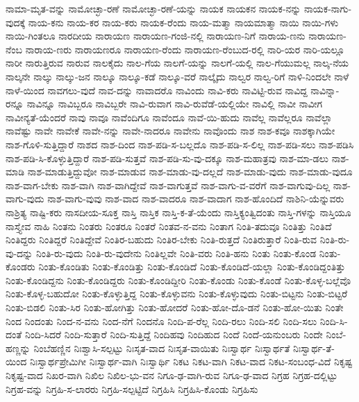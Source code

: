 {ನಾಮಾ-ಮೃತ-ವನ್ನು
ನಾಮೋಚ್ಛಾ-ರಣೆ
ನಾಮೋಚ್ಛಾ-ರಣೆ-ಯನ್ನು
ನಾಯಕ
ನಾಯಕನ
ನಾಯಕ-ನನ್ನು
ನಾಯಕ-ನಾಗು-ವುದಕ್ಕೆ
ನಾಯ-ಕನು
ನಾಯ-ಕರ
ನಾಯ-ಕರು
ನಾಯಕ-ರೆಂದು
ನಾಯ-ಮತ್ಮಾ
ನಾಯಮಾತ್ಮಾ
ನಾಯಿ
ನಾಯಿ-ಗಳು
ನಾಯಿ-ಗಿಂತಲೂ
ನಾರದೀಯ
ನಾರಾಯಣ
ನಾರಾಯಣ-ಗಂಜಿ-ನಲ್ಲಿ
ನಾರಾಯಣ-ನಿಗೆ
ನಾರಾಯ-ಣನು
ನಾರಾಯಣ-ನೆಂಬ
ನಾರಾಯ-ಣರು
ನಾರಾಯಣರೂ
ನಾರಾಯಣ-ರೆಂದು
ನಾರಾಯಣ-ರೆಂಬುದ-ರಲ್ಲಿ
ನಾರಿ-ಯರ
ನಾರಿ-ಯಲ್ಲೂ
ನಾರೀ
ನಾರುತ್ತಿರುವ
ನಾರುವ
ನಾಲಕೈದು
ನಾಲ-ಗೆಯ
ನಾಲಗೆ-ಯನ್ನು
ನಾಲಗೆ-ಯಲ್ಲಿ
ನಾಲ-ಗೆಯುಮಲ್ಲ
ನಾಲ್ಕ-ನೆಯ
ನಾಲ್ಕನೇ
ನಾಲ್ಕು
ನಾಲ್ಕು-ಜನ
ನಾಲ್ಕೂ
ನಾಲ್ಕೂ-ಕಡೆ
ನಾಲ್ಕೂ-ವರೆ
ನಾಲ್ಕೈದು
ನಾಲ್ವರ
ನಾಲ್ವ-ರಿಗೆ
ನಾಳಿ-ನಿಂದಲೇ
ನಾಳೆ
ನಾಳೆ-ಯಿಂದ
ನಾವಗಲು-ವುದೆ
ನಾವ-ದನ್ನು
ನಾವಾದರೊ
ನಾವಿಂದು
ನಾವಿ-ಕರು
ನಾವಿಟ್ಟಿ-ರುವ
ನಾವಿದ್ದ
ನಾವಿನ್ನಾ-ರನ್ನೂ
ನಾವಿನ್ನೂ
ನಾವಿಬ್ಬರೂ
ನಾವಿಬ್ಬರೇ
ನಾವಿ-ರುವಾಗ
ನಾವಿ-ರುವೆಡೆ-ಯಲ್ಲಿಯೇ
ನಾವಿಲ್ಲಿ
ನಾವೀ
ನಾವೀಗ
ನಾವೀನ್ಯತೆ-ಯೆಂದರೆ
ನಾವು
ನಾವೂ
ನಾವೆಂದಿಗೂ
ನಾವೆಂದೂ
ನಾವೆ-ಯಿ-ಹುದು
ನಾವೆಲ್ಲ
ನಾವೆಲ್ಲರೂ
ನಾವೆಲ್ಲಾ
ನಾವೆಷ್ಟು
ನಾವೇ
ನಾವೇಕೆ
ನಾವೇ-ನನ್ನು
ನಾವೇ-ನಾದರೂ
ನಾವೇನು
ನಾವೊಂದು
ನಾಶ
ನಾಶ-ಕವೂ
ನಾಶಕ್ಕಾಗಿಯೇ
ನಾಶ-ಗೊಳಿ-ಸುತ್ತಿದ್ದಾರೆ
ನಾಶದ
ನಾಶ-ದಿಂದ
ನಾಶ-ಪಡಿ-ಸ-ಬಲ್ಲದೊ
ನಾಶ-ಪಡಿ-ಸ-ಲಿಲ್ಲ
ನಾಶ-ಪಡಿ-ಸಲು
ನಾಶ-ಪಡಿಸಿ
ನಾಶ-ಪಡಿ-ಸಿ-ಕೊಳ್ಳುತ್ತಿದ್ದಾರೆ
ನಾಶ-ಪಡಿ-ಸುತ್ತವೆ
ನಾಶ-ಪಡಿ-ಸು-ವು-ದಕ್ಕೂ
ನಾಶ-ಮಹಾತ್ರವು
ನಾಶ-ಮಾ-ಡಲು
ನಾಶ-ಮಾಡಿ
ನಾಶ-ಮಾಡುತ್ತಿದ್ದುವೋ
ನಾಶ-ಮಾಡುವ
ನಾಶ-ಮಾಡು-ವು-ದಲ್ಲದೆ
ನಾಶ-ಮಾಡು-ವುದು
ನಾಶ-ಮಾಡು-ವುದೂ
ನಾಶ-ವಾಗ-ಬೇಕು
ನಾಶ-ವಾಗಿ
ನಾಶ-ವಾಗಿದ್ದೇವೆ
ನಾಶ-ವಾಗುತ್ತವೆ
ನಾಶ-ವಾಗು-ವ-ವರೆಗೆ
ನಾಶ-ವಾಗುವು-ದಿಲ್ಲ
ನಾಶ-ವಾಗು-ವುದು
ನಾಶ-ವಾಗು-ವುವು
ನಾಶ-ವಾದ
ನಾಶ-ವಾದರೂ
ನಾಶ-ವಾದಾಗ
ನಾಶ-ಹೊಂದಿದೆ
ನಾಶಿನಿ-ಯೆನ್ನುವರು
ನಾಶ್ರಿತ್ಯ
ನಾಷ್ಟಿ-ಕರು
ನಾಸದೀಯ-ಸೂಕ್ತ
ನಾಸ್ತಿ
ನಾಸ್ತಿಕ
ನಾಸ್ತಿ-ಕ-ತೆ-ಯೆಂದು
ನಾಸ್ತಿಕ್ಯಂತ್ವಿದಂತು
ನಾಸ್ತಿ-ಗಳನ್ನು
ನಾಸ್ತಿಯೂ
ನಾಸ್ತ್ಯೇವ
ನಾಹಿ
ನಿಂತನು
ನಿಂತರು
ನಿಂತರೂ
ನಿಂತರೆ
ನಿಂತವ-ನ-ವನು
ನಿಂತಾಗ
ನಿಂತಿ-ತದುವೂ
ನಿಂತಿತ್ತು
ನಿಂತಿದೆ
ನಿಂತಿದ್ದರು
ನಿಂತಿದ್ದರೆ
ನಿಂತಿದ್ದೇವೆ
ನಿಂತಿರ-ಬಹುದು
ನಿಂತಿರ-ಬೇಕು
ನಿಂತಿ-ರುತ್ತದೆ
ನಿಂತಿರುತ್ತಾರೆ
ನಿಂತಿ-ರುವ
ನಿಂತಿ-ರು-ವು-ದನ್ನು
ನಿಂತಿ-ರು-ವುದು
ನಿಂತಿ-ರು-ವುದೇನು
ನಿಂತಿಲ್ಲವೇ
ನಿಂತಿ-ವರು
ನಿಂತಿ-ಹನು
ನಿಂತು
ನಿಂತು-ಕೊಂಡ
ನಿಂತು-ಕೊಂಡರು
ನಿಂತು-ಕೊಂಡಿತು
ನಿಂತು-ಕೊಂಡಿತ್ತು
ನಿಂತು-ಕೊಂಡಿದೆ
ನಿಂತು-ಕೊಂಡಿದೆ-ಯಲ್ಲಾ
ನಿಂತು-ಕೊಂಡಿದ್ದಂತಿತ್ತು
ನಿಂತು-ಕೊಂಡಿದ್ದನು
ನಿಂತು-ಕೊಂಡಿದ್ದರು
ನಿಂತು-ಕೊಂಡಿದ್ದೀರಿ
ನಿಂತು-ಕೊಂಡು
ನಿಂತು-ಕೊಂಡೆ
ನಿಂತು-ಕೊಳ್ಳ-ಬಲ್ಲೆವೊ
ನಿಂತು-ಕೊಳ್ಳ-ಬಹುದೋ
ನಿಂತು-ಕೊಳ್ಳುತ್ತಿದ್ದ
ನಿಂತು-ಕೊಳ್ಳುವನು
ನಿಂತು-ಕೊಳ್ಳುವುದು
ನಿಂತು-ಬಿಟ್ಟನು
ನಿಂತು-ಬಿಟ್ಟರೆ
ನಿಂತು-ಬಿಡಲಿ
ನಿಂತು-ಸಿರ
ನಿಂತು-ಹೋಗಿತ್ತು
ನಿಂತು-ಹೋದರೆ
ನಿಂತು-ಹೋ-ದೊ-ಡನೆ
ನಿಂತು-ಹೋ-ಯಿತು
ನಿಂತೇ
ನಿಂದ
ನಿಂದಂತು
ನಿಂದ-ನ-ವನು
ನಿಂದ-ನೆಗೆ
ನಿಂದನೊ
ನಿಂದಿ-ಪ-ರೆಲ್ಲ
ನಿಂದಿ-ರಲು
ನಿಂದಿ-ಸಲಿ
ನಿಂದಿ-ಸಲು
ನಿಂದಿ-ಸಿ-ದಂತೆ
ನಿಂದಿ-ಸಿದರೆ
ನಿಂದಿ-ಸುತ್ತಾರೆ
ನಿಂದಿ-ಸುತ್ತಿದ್ದೆ
ನಿಂದಿಹವು
ನಿಂದಿಹುದ
ನಿಂದೆ
ನಿಂದೆ-ಯನುಂಬರು
ನಿಂದೇ
ನಿಂಬೆ-ಹಣ್ಣನ್ನು
ನಿಂಬೆಹಣ್ಣಿನ
ನಿಃಶ್ವಾಸಿ-ಸಲ್ಪಟ್ಟು
ನಿಃಸೃತ-ವಾದ
ನಿಃಸೃತ-ವಾಯಿತು
ನಿಃಸ್ವಾರ್ಥ
ನಿಃಸ್ವಾರ್ಥತೆ
ನಿಃಸ್ವಾರ್ಥ-ತೆ-ಯಿಂದ
ನಿಃಸ್ವಾರ್ಥಪ್ರೇಮಿಗೀ
ನಿಃಸ್ವಾರ್ಥ-ವಾಗಿ
ನಿಃಸ್ವಾರ್ಥಿ
ನಿಕಟ
ನಿಕಟ-ವಾಗಿ
ನಿಕಟ-ವಾದ
ನಿಕಟ-ಸಂಬಂಧ-ವಿದೆ
ನಿಕೃಷ್ಟ
ನಿಕೃಷ್ಟ-ವಾದ
ನಿಖರ-ವಾಗಿ
ನಿಖಿಲ
ನಿಖಿಲ-ಭು-ವನ
ನಿಗೂ-ಢ-ವಾಗಿ-ರುವ
ನಿಗೂ-ಢ-ವಾದ
ನಿಗ್ರಹ
ನಿಗ್ರಹ-ದಲ್ಲಿಟ್ಟು
ನಿಗ್ರಹ-ವನ್ನು
ನಿಗ್ರಹಿ-ಸ-ಲಾರರು
ನಿಗ್ರಹಿ-ಸಲ್ಪಟ್ಟಿದೆ
ನಿಗ್ರಹಿಸಿ
ನಿಗ್ರಹಿಸಿ-ಕೊಂಡು
ನಿಗ್ರಹಿಸು
}
